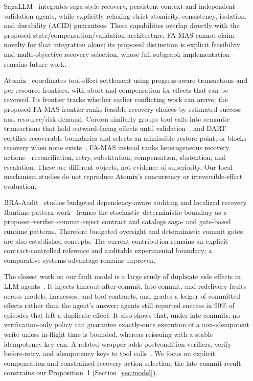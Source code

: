 \documentclass[10pt,journal,compsoc]{IEEEtran}
\newcommand{\famas}{FA-MAS}
\begin{document}
SagaLLM~\cite{chang2025sagallm} integrates saga-style recovery, persistent context and independent validation agents, while explicitly relaxing strict atomicity, consistency, isolation, and durability (ACID) guarantees. These capabilities overlap directly with the proposed state/compensation/validation architecture. \famas{} cannot claim novelty for that integration alone; its proposed distinction is explicit feasibility and multi-objective recovery selection, whose full subgraph implementation remains future work.

Atomix~\cite{mohammadi2026atomix} coordinates tool-effect settlement using progress-aware transactions and per-resource frontiers, with abort and compensation for effects that can be reversed. Its frontier tracks whether earlier conflicting work can arrive; the proposed \famas{} frontier ranks feasible recovery choices by estimated success and resource/risk demand. Cordon similarly groups tool calls into semantic transactions that hold outward-facing effects until validation~\cite{chen2026cordon}, and DART certifies recoverable boundaries and selects an admissible restore point, or blocks recovery when none exists~\cite{yang2026dart}. \famas{} instead ranks heterogeneous recovery actions---reconciliation, retry, substitution, compensation, abstention, and escalation. These are different objects, not evidence of superiority. Our local mechanism studies do not reproduce Atomix's concurrency or irreversible-effect evaluation.

BRA-Audit~\cite{wang2026braaudit} studies budgeted dependency-aware auditing and localized recovery. Runtime-pattern work~\cite{srinivasan2026patterns} frames the stochastic--deterministic boundary as a proposer--verifier--commit--reject contract and catalogs saga- and gate-based runtime patterns. Therefore budgeted oversight and deterministic commit gates are also established concepts. The current contribution remains an explicit contract-controlled reference and auditable experimental boundary; a comparative systems advantage remains unproven.

The closest work on our fault model is a large study of duplicate side effects in LLM agents~\cite{li2026exactlyonce}. It injects timeout-after-commit, late-commit, and redelivery faults across models, harnesses, and tool contracts, and grades a ledger of committed effects rather than the agent's answer; agents still reported success in 90\% of episodes that left a duplicate effect. It also shows that, under late commits, no verification-only policy can guarantee exactly-once execution of a non-idempotent write unless in-flight time is bounded, whereas reissuing with a stable idempotency key can. A related wrapper adds postcondition verifiers, verify-before-retry, and idempotency keys to tool calls~\cite{mansoor2026verified}. We focus on explicit compensation and constrained recovery-action selection; the late-commit result constrains our Proposition~1 (Section~\ref{sec:model}).
\end{document}
